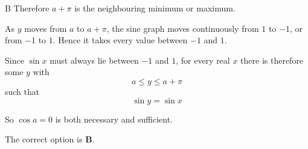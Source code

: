 \documentclass[11pt,a4paper]{article}
\begin{document}
\begin{enumerate}[label=\textbf{\arabic*.},leftmargin=*,itemsep=0pt,start=17]
\begin{djsSolution}{B}
Therefore \(a+\pi\) is the neighbouring minimum or maximum.

As \(y\) moves from \(a\) to \(a+\pi\), the sine graph moves continuously from \(1\) to \(-1\), or from \(-1\) to \(1\). Hence it takes every value between \(-1\) and \(1\).

Since \(\sin x\) must always lie between \(-1\) and \(1\), for every real \(x\) there is therefore some \(y\) with
\[
a\leq y\leq a+\pi
\]
such that
\[
\sin y=\sin x
\]

So \(\cos a=0\) is both necessary and sufficient.

The correct option is \textbf{B}.
\end{djsSolution}
\end{enumerate}
\clearpage
\thispagestyle{djssolutions}
\vspace*{8pt}
\end{document}

